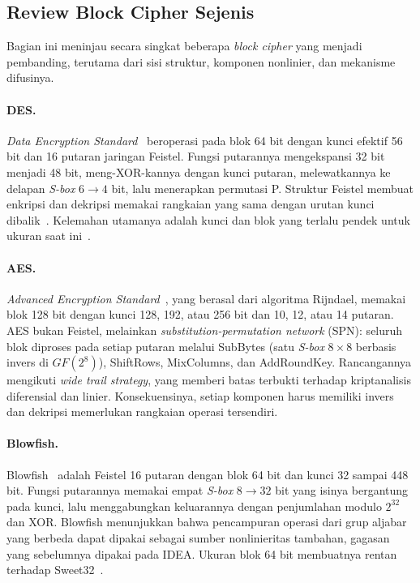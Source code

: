 \subsection{Review Block Cipher Sejenis}
Bagian ini meninjau secara singkat beberapa \textit{block cipher} yang menjadi pembanding, terutama
dari sisi struktur, komponen nonlinier, dan mekanisme difusinya.

\paragraph{DES.} \textit{Data Encryption Standard}~\cite{rinaldi} beroperasi pada blok 64 bit dengan kunci
efektif 56 bit dan 16 putaran jaringan Feistel. Fungsi putarannya mengekspansi 32 bit
menjadi 48 bit, meng-XOR-kannya dengan kunci putaran, melewatkannya ke delapan \textit{S-box}
$6 \to 4$ bit, lalu menerapkan permutasi P. Struktur Feistel membuat enkripsi dan dekripsi memakai
rangkaian yang sama dengan urutan kunci dibalik~\cite{rinaldi}. Kelemahan utamanya adalah kunci dan blok
yang terlalu pendek untuk ukuran saat ini~\cite{rinaldi,sweet32}.

\paragraph{AES.} \textit{Advanced Encryption Standard}~\cite{rinaldi,angraini}, yang berasal dari algoritma
Rijndael, memakai blok 128 bit dengan kunci 128, 192, atau 256 bit dan 10, 12, atau 14
putaran. AES bukan Feistel, melainkan \textit{substitution-permutation network} (SPN): seluruh blok
diproses pada setiap putaran melalui SubBytes (satu \textit{S-box} $8 \times 8$ berbasis invers di
$GF(2^8)$), ShiftRows, MixColumns, dan AddRoundKey. Rancangannya mengikuti \textit{wide trail
strategy}, yang memberi batas terbukti terhadap kriptanalisis diferensial dan linier. Konsekuensinya,
setiap komponen harus memiliki invers dan dekripsi memerlukan rangkaian operasi tersendiri.

\paragraph{Blowfish.} Blowfish~\cite{siregar} adalah Feistel 16 putaran dengan blok 64 bit dan kunci
32 sampai 448 bit. Fungsi putarannya memakai empat \textit{S-box} $8 \to 32$ bit yang isinya bergantung
pada kunci, lalu menggabungkan keluarannya dengan penjumlahan modulo $2^{32}$ dan XOR. Blowfish
menunjukkan bahwa pencampuran operasi dari grup aljabar yang berbeda dapat dipakai sebagai sumber
nonlinieritas tambahan, gagasan yang sebelumnya dipakai pada IDEA. Ukuran blok 64 bit
membuatnya rentan terhadap Sweet32~\cite{sweet32}.

